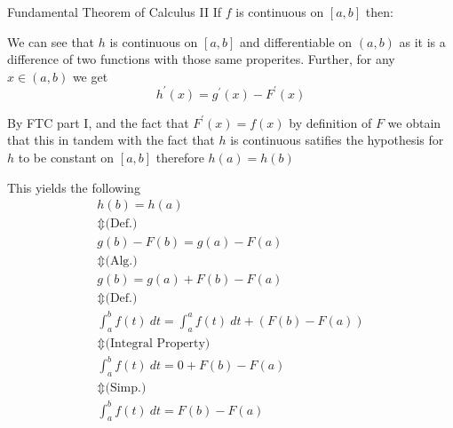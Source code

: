 \begin{proposition}{Fundamental Theorem of Calculus II}
  If $f$ is continuous on $ \left[ a, b \right]$ then:
      \item We can see that $h$ is continuous on $ \left[ a, b \right]$ and differentiable on $ \left(  a, b \right)$ as it is a difference of two functions with those same properites. Further, for any $x \in  \left( a, b \right)$ we get
        \[
        h ^{\prime}\left(x\right) = g ^{\prime}\left(x\right)  -  F ^{\prime}\left(x\right)
        \]
      \item By FTC part I, and the fact that $F ^{\prime}\left(x\right) = f\left(x\right)$ by definition of $F$ we obtain that 
        this in tandem with the fact that $h$ is continuous satifies the hypothesis for $h$ to be constant on $ \left[ a,b \right]$ therefore $h\left(a\right) = h\left(b\right)$ 
      \item This yields the following
        \begin{gather*}
          h\left(b\right) = h\left(a\right) \\
          \Updownarrow \text{(Def.)} \\
          g\left(b\right)  -  F\left(b\right) = g\left(a\right)  -  F\left(a\right)\\
          \Updownarrow \text{(Alg.)} \\
          g\left(b\right)  =    g\left(a\right) + F\left(b\right)  -  F\left(a\right)\\
          \Updownarrow \text{(Def.)} \\
          \int _{a} ^{b} f\left(t\right)\: dt = \int _{a} ^{a} f\left(t\right)\: dt   +  \left( F\left(b\right)  -  F\left(a\right) \right) \\
          \Updownarrow \text{(Integral Property)} \\
          \int _{a} ^{b} f\left(t\right)\: dt = 0  +  F\left(b\right)  -  F\left(a\right) \\
          \Updownarrow \text{(Simp.)} \\
          \int _{a} ^{b} f\left(t\right)\: dt = F\left(b\right)  -  F\left(a\right)
        \end{gather*}
\end{proposition}




